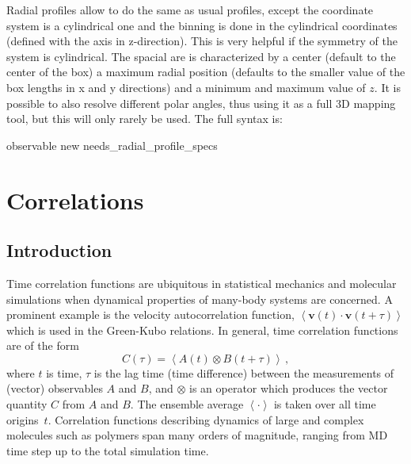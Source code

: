 Radial profiles allow to do the same as usual profiles, except the coordinate system is a cylindrical
one and the binning is done in the cylindrical coordinates (defined with the axis in z-direction). 
This is very helpful if the symmetry of the
system is cylindrical. The spacial are is characterized by a center (default to the center of the box)
a maximum radial position  (defaults to the smaller value of the box lengths in x and y directions)
and a minimum and maximum value of $z$. It is possible to also resolve different polar angles, thus using it
as a full 3D mapping tool, but this will only rarely be used. The full syntax is:
\begin{essyntax}
    observable new needs\_radial\_profile\_specs  
\end{essyntax}


\section{Correlations}
\label{sec:Correlations}

\subsection{Introduction}
Time correlation functions are ubiquitous in statistical mechanics and molecular
simulations when dynamical properties of many-body systems are concerned.
A prominent example is the velocity autocorrelation function,  
$ \left< \mathbf{v}(t) \cdot \mathbf{v}(t+\tau) \right> $ 
which is used in the Green-Kubo relations.
In general, time correlation functions are of the form
\begin{equation}
C(\tau) = \left<A\left(t\right) \otimes B\left(t+\tau\right)\right>\,,
\label{eq:corr.def}
\end{equation}
where $t$ is time, $\tau$ is the lag time (time difference) between 
the measurements of (vector) observables $A$ and $B$, and $\otimes$ is an
operator which produces the vector quantity $C$ from $A$ and $B$. 
The ensemble average $\left< \cdot \right>$ is taken over all time origins~$t$. 
Correlation functions describing dynamics of large and complex molecules 
such as polymers span many orders of magnitude, ranging from MD time step
up to the total simulation time. 

